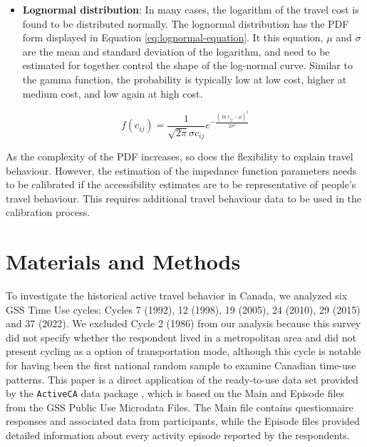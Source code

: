 \documentclass[preprint, 3p,
authoryear]{elsarticle} %
\providecommand{\tightlist}{%
  \setlength{\itemsep}{0pt}\setlength{\parskip}{0pt}}
\begin{document}
\begin{itemize}
\tightlist
\item
  \textbf{Lognormal distribution}: In many cases, the logarithm of the
  travel cost is found to be distributed normally. The lognormal
  distribution has the PDF form displayed in Equation
  \ref{eq:lognormal-equation}. It this equation, \(\mu\) and \(\sigma\)
  are the mean and standard deviation of the logarithm, and need to be
  estimated for together control the shape of the log-normal curve.
  Similar to the gamma function, the probability is typically low at low
  cost, higher at medium cost, and low again at high cost.
\end{itemize}

\begin{equation}
f(c_{ij}) = \frac{1}{\sqrt{2\pi} \sigma c_{ij}} e^{-\frac{(\ln c_{ij} - \mu)^2}{2\sigma^2}}
\label{eq:lognormal-equation}
\end{equation}

As the complexity of the PDF increases, so does the flexibility to
explain travel behaviour. However, the estimation of the impedance
function parameters needs to be calibrated if the accessibility
estimates are to be representative of people's travel behaviour. This
requires additional travel behaviour data to be used in the calibration
process.

\section{Materials and Methods}\label{materials-and-methods}

To investigate the historical active travel behavior in Canada, we
analyzed six GSS Time Use cycles: Cycles 7 (1992), 12 (1998), 19 (2005),
24 (2010), 29 (2015) and 37 (2022). We excluded Cycle 2 (1986) from our
analysis because this survey did not specify whether the respondent
lived in a metropolitan area and did not present cycling as a option of
transportation mode, although this cycle is notable for having been the
first national random sample to examine Canadian time-use patterns. This
paper is a direct application of the ready-to-use data set provided by
the \texttt{ActiveCA} data package \citep{dossantos2025}, which is based
on the Main and Episode files from the GSS Public Use Microdata Files.
The Main file contains questionnaire responses and associated data from
participants, while the Episode files provided detailed information
about every activity episode reported by the respondents.
\end{document}
